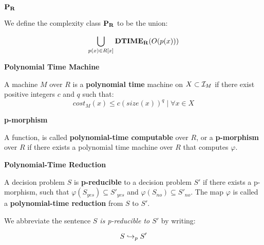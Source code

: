 \begin{definition}{$\mathbf{P_R}$}

  We define the complexity class $\mathbf{P_R}$ to be the union:

  $$\bigcup_{p(x) \in R[x]}\mathbf{DTIME_R}(O(p(x)))$$

\end{definition}

\begin{example}
\end{example}

\begin{definition}{\textbf{Polynomial Time Machine}}

  A machine $M$ over $R$ is a \textbf{polynomial time} machine on $X
  \subset \mathcal{I}_M$ if there exist positive integers $c$ and $q$
  such that:
  $$cost_M(x) \leq c(size(x))^q \mid \forall x \in X$$
\end{definition}

\begin{definition}{\textbf{p-morphism}}
  
  A function,  is called
  \textbf{polynomial-time computable} over $R$, or a
  \textbf{p-morphism} over $R$ if there exists a polynomial time
  machine over $R$ that computes $\varphi$.
\end{definition}

\begin{definition}{\textbf{Polynomial-Time Reduction}}

  A decision problem $S$ is \textbf{p-reducible} to a decision problem
  $S'$ if there exists a p-morphism,
   such that $\varphi(S_{yes})
  \subseteq S'_{yes}$ and $\varphi(S_{no}) \subseteq S'_{no}$.  The
  map $\varphi$ is called a \textbf{polynomial-time reduction} from
  $S$ to $S'$.

  We abbreviate the sentence \emph{$S$ is p-reducible to $S'$} by writing:

  $$S \hookrightarrow_p S'$$
  \end{definition}


